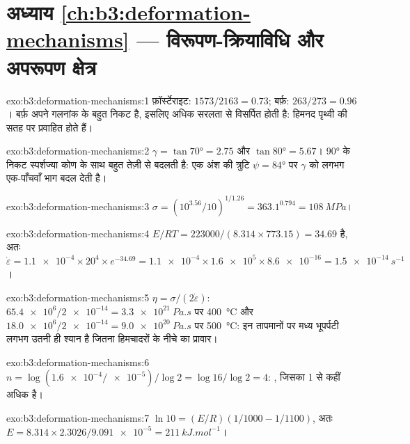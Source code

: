 \section*{अध्याय \ref{ch:b3:deformation-mechanisms} --- विरूपण-क्रियाविधि और अपरूपण क्षेत्र}

\begin{solution}{exo:b3:deformation-mechanisms:1}
फ़ॉर्स्टेराइट: $1573/2163 = 0.73$; बर्फ़: $263/273 = 0.96$। बर्फ़ अपने गलनांक के
बहुत निकट है, इसलिए अधिक सरलता से विसर्पित होती है: हिमनद पृथ्वी की
सतह पर प्रवाहित होते हैं।
\end{solution}

\begin{solution}{exo:b3:deformation-mechanisms:2}
$\gamma = \tan\ang{70} = 2.75$ और $\tan\ang{80} = 5.67$। \ang{90} के निकट
स्पर्शज्या कोण के साथ बहुत तेज़ी से बदलती है: एक अंश की त्रुटि $\psi =
\ang{84}$ पर $\gamma$ को लगभग एक-पाँचवाँ भाग बदल देती है।
\end{solution}

\begin{solution}{exo:b3:deformation-mechanisms:3}
$\sigma = (10^{3.56}/10)^{1/1.26} = 363.1^{0.794} = \qty{108}{MPa}$।
\end{solution}

\begin{solution}{exo:b3:deformation-mechanisms:4}
$E/RT = 223000/(8.314\times773.15) = 34.69$ है, अतः $\dot\varepsilon =
\num{1.1e-4}\times20^4\times e^{-34.69} = \num{1.1e-4}\times\num{1.6e5}\times
\num{8.6e-16} = \qty{1.5e-14}{s^{-1}}$।
\end{solution}

\begin{solution}{exo:b3:deformation-mechanisms:5}
$\eta = \sigma/(2\dot\varepsilon)$: $\num{65.4e6}/\num{2e-14} =
\qty{3.3e21}{Pa.s}$ पर \qty{400}{\celsius} और $\num{18.0e6}/\num{2e-14} =
\qty{9.0e20}{Pa.s}$ पर \qty{500}{\celsius}: इन तापमानों पर मध्य भूपर्पटी
लगभग उतनी ही श्यान है जितना हिमचादरों के नीचे का प्रावार।
\end{solution}

\begin{solution}{exo:b3:deformation-mechanisms:6}
$n = \log(\num{1.6e-4}/\num{e-5})/\log2 = \log16/\log2 = 4$: ,
जिसका  1 से कहीं अधिक है।
\end{solution}

\begin{solution}{exo:b3:deformation-mechanisms:7}
$\ln10 = (E/R)(1/1000 - 1/1100)$, अतः $E = 8.314\times2.3026/\num{9.091e-5} =
\qty{211}{kJ.mol^{-1}}$।
\end{solution}

